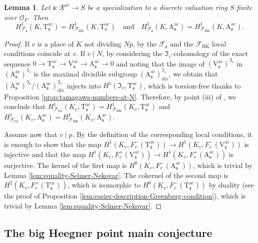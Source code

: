 \documentclass[12pt,reqno]{amsart}
\newtheorem{lemma}[theorem]{Lemma}
\theoremstyle{definition}
\theoremstyle{remark}
\newcommand{\OF}{\mathcal{O}_F}
\newcommand{\V}{\boldsymbol{\mathrm{V}}}
\newcommand{\T}{\boldsymbol{\mathrm{T}}}
\newcommand{\calR}{\mathcal{R}}
\newcommand{\A}{\boldsymbol{\mathrm{A}}}
\newcommand{\ac}{\mathrm{ac}}
\newcommand{\Gr}{\mathrm{Gr}}
\newcommand{\BK}{\mathrm{BK}}
\newcommand{\di}{\mathrm{div}}
\newcommand{\sfrak}{\mathfrak{s}}
\begin{document}
\begin{lemma}\label{lem:Greenberg=Bloch-Kato}
    Let $\sfrak\colon \calR^{\ac}\to S$ be a specialization to a discrete valuation ring $S$ finite over $\OF$. Then
    \begin{equation*}
        H^1_{\mathcal{F}_\sfrak}(K,\T_\sfrak^\ac)= H^1_{\mathcal{F}_\BK}(K,\T_\sfrak^\ac)\quad\text{and}\quad H^1_{\mathcal{F}_\sfrak}(K,\A_\sfrak^\ac)= H^1_{\mathcal{F}_\BK}(K,\A_\sfrak^\ac).
    \end{equation*}
\end{lemma}
\begin{proof}
    If $v$ is a place of $K$ not dividing $Np$, by \cite[Lemma 3.5]{Rubin00:euler-systems} the $\mathcal{F}_\sfrak$ and the $\mathcal{F}_{\BK}$ local conditions coincide at $v$. If $v\mid N$, by considering the $\mathfrak{I}_v$-cohomology of the exact sequence $0\to \T^\ac_\sfrak\to\V^\ac_\sfrak\to\A^\ac_\sfrak\to 0$ and noting that the image of $(\V^\ac_\sfrak)^{\mathfrak{I}_v}$ in $(\A^\ac_\sfrak)^{\mathfrak{I}_v}$ is the maximal divisible subgroup $(\A^\ac_\sfrak)^{\mathfrak{I}_v}_{\di}$, we obtain that $(\A^\ac_\sfrak)^{\mathfrak{I}_v}/(\A^\ac_\sfrak)^{\mathfrak{I}_v}_{\di}$ injects into $H^1(\mathfrak{I}_v, \T^\ac_\sfrak)$, which is torsion-free thanks to Proposition \ref{prop:tamagawa-numbers-at-N}. Therefore, by point (iii) of \cite[Lemma 3.5]{Rubin00:euler-systems}, we conclude that $H^1_{\mathcal{F}_\Gr}(K_v,\T_\sfrak^\ac)= H^1_{\mathcal{F}_\BK}(K_v,\T_\sfrak^\ac)$ and $H^1_{\mathcal{F}_\Gr}(K_v,\A_\sfrak^\ac)= H^1_{\mathcal{F}_\BK}(K_v,\A_\sfrak^\ac)$.

    Assume now that $v\mid p$. By the definition of the corresponding local conditions, it is enough to show that the map $H^1(K_v, F_v^-(\T^\ac_\sfrak))\to H^1(K_v, F_v^-(\V^\ac_\sfrak))$ is injective and that the map $H^1(K_v, F_v^+(\V^\ac_\sfrak))\to H^1(K_v, F_v^+(\A^\ac_\sfrak))$ is surjective. The kernel of the first map is $H^0(K_v, F_v^-(\A^\ac_\sfrak))$, which is trivial by Lemma \ref{lem:equality-Selmer-Nekovar}. The cokernel of the second map is $H^2(K_v, F_v^+(\T^\ac_\sfrak))$, which is isomorphic to $H^0(K_v,F_v^-(\T^\ac_\sfrak))$ by duality (see the proof of Proposition \ref{lem:easier-description-Greenberg-condition}), which is trivial by Lemma \ref{lem:equality-Selmer-Nekovar}.
\end{proof}


\subsection{The big Heegner point main conjecture}\label{sec:big-heegner-point-main-conjecture}
\end{document}
